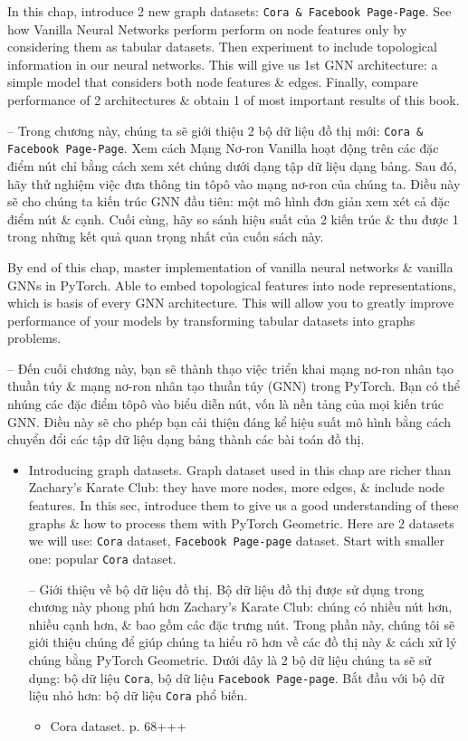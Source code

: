 \documentclass{article}
\begin{document}
\begin{itemize}
    In this chap, introduce 2 new graph datasets: {\tt Cora \& Facebook Page-Page}. See how Vanilla Neural Networks perform perform on node features only by considering them as tabular datasets. Then experiment to include topological information in our neural networks. This will give us 1st GNN architecture: a simple model that considers both node features \& edges. Finally, compare performance of 2 architectures \& obtain 1 of most important results of this book.

    -- Trong chương này, chúng ta sẽ giới thiệu 2 bộ dữ liệu đồ thị mới: {\tt Cora \& Facebook Page-Page}. Xem cách Mạng Nơ-ron Vanilla hoạt động trên các đặc điểm nút chỉ bằng cách xem xét chúng dưới dạng tập dữ liệu dạng bảng. Sau đó, hãy thử nghiệm việc đưa thông tin tôpô vào mạng nơ-ron của chúng ta. Điều này sẽ cho chúng ta kiến trúc GNN đầu tiên: một mô hình đơn giản xem xét cả đặc điểm nút \& cạnh. Cuối cùng, hãy so sánh hiệu suất của 2 kiến trúc \& thu được 1 trong những kết quả quan trọng nhất của cuốn sách này.

    By end of this chap, master implementation of vanilla neural networks \& vanilla GNNs in PyTorch. Able to embed topological features into node representations, which is basis of every GNN architecture. This will allow you to greatly improve performance of your models by transforming tabular datasets into graphs problems.

    -- Đến cuối chương này, bạn sẽ thành thạo việc triển khai mạng nơ-ron nhân tạo thuần túy \& mạng nơ-ron nhân tạo thuần túy (GNN) trong PyTorch. Bạn có thể nhúng các đặc điểm tôpô vào biểu diễn nút, vốn là nền tảng của mọi kiến trúc GNN. Điều này sẽ cho phép bạn cải thiện đáng kể hiệu suất mô hình bằng cách chuyển đổi các tập dữ liệu dạng bảng thành các bài toán đồ thị.
    \begin{itemize}
        \item {\sf Introducing graph datasets.} Graph dataset used in this chap are richer than Zachary's Karate Club: they have more nodes, more edges, \& include node features. In this sec, introduce them to give us a good understanding of these graphs \& how to process them with PyTorch Geometric. Here are 2 datasets we will use: {\tt Cora} dataset, {\tt Facebook Page-page} dataset. Start with smaller one: popular {\tt Cora} dataset.

        -- {\sf Giới thiệu về bộ dữ liệu đồ thị.} Bộ dữ liệu đồ thị được sử dụng trong chương này phong phú hơn Zachary's Karate Club: chúng có nhiều nút hơn, nhiều cạnh hơn, \& bao gồm các đặc trưng nút. Trong phần này, chúng tôi sẽ giới thiệu chúng để giúp chúng ta hiểu rõ hơn về các đồ thị này \& cách xử lý chúng bằng PyTorch Geometric. Dưới đây là 2 bộ dữ liệu chúng ta sẽ sử dụng: bộ dữ liệu {\tt Cora}, bộ dữ liệu {\tt Facebook Page-page}. Bắt đầu với bộ dữ liệu nhỏ hơn: bộ dữ liệu {\tt Cora} phổ biến.
        \begin{itemize}
            \item {\sf Cora dataset.} p. 68+++
        \end{itemize}


\end{itemize}
\end{itemize}
\end{document}
